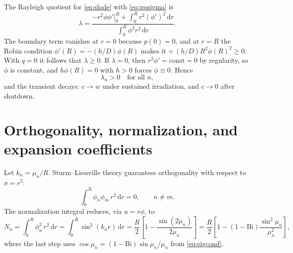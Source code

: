 \documentclass[11pt,a4paper]{article}
\newcommand{\Bi}{\mathrm{Bi}}
\newcommand{\dd}{\,\mathrm{d}}
\begin{document}
The Rayleigh quotient for \eqref{eq:slode} with \eqref{eq:pqsigma} is
\begin{equation}
\lambda = \frac{-r^2\phi\phi'\big|_0^R + \displaystyle\int_0^R r^2 (\phi')^2 \dd r}
{\displaystyle\int_0^R \phi^2 r^2 \dd r}.
\end{equation}
The boundary term vanishes at $r=0$ because $p(0)=0$, and at $r=R$ the Robin condition
$\phi'(R) = -(h/D)\phi(R)$ makes it $+\,(h/D)R^2\phi(R)^2 \ge 0$. With $q=0$ it follows
that $\lambda \ge 0$. If $\lambda = 0$, then $r^2\phi' = \text{const} = 0$ by
regularity, so $\phi$ is constant, and $h\phi(R)=0$ with $h>0$ forces $\phi\equiv 0$.
Hence
\begin{equation}
\lambda_n > 0 \quad \text{for all } n,
\end{equation}
and the transient decays: $c \to w$ under sustained irradiation, and $c \to 0$ after
shutdown.

\section{Orthogonality, normalization, and expansion coefficients}

Let $k_n = \mu_n/R$. Sturm--Liouville theory guarantees orthogonality with respect to
$\sigma = r^2$:
\begin{equation}
\int_0^R \phi_n\phi_m\, r^2 \dd r = 0, \qquad n\neq m .
\end{equation}
The normalization integral reduces, via $u = r\phi$, to
\begin{equation}
N_n = \int_0^R \phi_n^2\, r^2 \dd r
= \int_0^R \sin^2(k_n r)\dd r
= \frac{R}{2}\left[1 - \frac{\sin(2\mu_n)}{2\mu_n}\right]
= \frac{R}{2}\left[1 - (1-\Bi)\frac{\sin^2\mu_n}{\mu_n^2}\right],
\label{eq:norm}
\end{equation}
where the last step uses $\cos\mu_n = (1-\Bi)\sin\mu_n/\mu_n$ from \eqref{eq:eigcond}.
\end{document}
